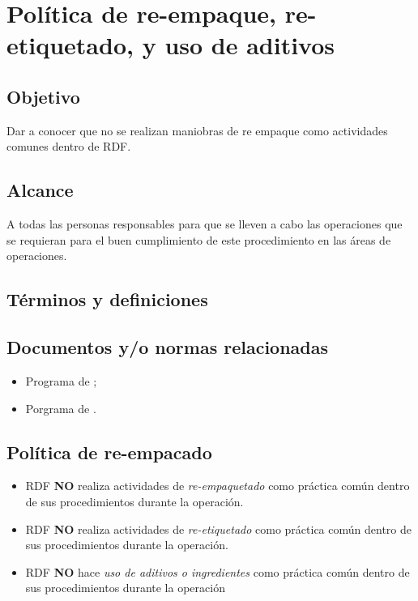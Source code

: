 \thispagestyle{formato-PI}
\renewcommand{\MayorVer}{2}
\renewcommand{\MenorVer}{0}
\renewcommand{\FechaPub}{2023--01}
\renewcommand{\TipoID}{POL}
\renewcommand{\Titulo}{Política de re-empaque, re-etiquetado, y uso de aditivos}

\section{\Titulo}
\renewcommand{\Codigo}{\Prog--\thesection--\TipoID}
\subsection{Objetivo}
Dar a conocer que no se realizan maniobras de re empaque como actividades comunes dentro de \gls{RDF}.

\subsection{Alcance}
A todas las personas responsables para que se lleven a cabo las operaciones que se requieran para el buen cumplimiento de este procedimiento en las áreas de operaciones.

\subsection{Términos y definiciones}
\begin{description}
\end{description}

\subsection{Documentos y/o normas relacionadas}
\begin{itemize}
	\item Programa de ;
	\item Porgrama de .
\end{itemize}

\subsection{Política de re-empacado}
\begin{itemize}\label{pol:reempaquetado}
	\item \gls{RDF} \textbf{NO} realiza actividades de \emph{re-empaquetado} como práctica común dentro de sus procedimientos durante la operación.
	\item \gls{RDF} \textbf{NO} realiza actividades de \emph{re-etiquetado} como práctica común dentro de sus procedimientos durante la operación.
	\item \gls{RDF} \textbf{NO} hace \emph{uso de aditivos o ingredientes} como práctica común dentro de sus procedimientos durante la operación
\end{itemize}

